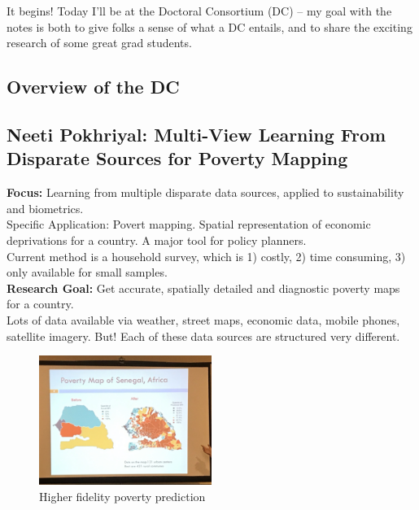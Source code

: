 It begins! Today I'll be at the Doctoral Consortium (DC) -- my goal with the notes is both to give folks a sense of what a DC entails, and to share the exciting research of some great grad students. \\

\subsection{Overview of the DC}




\subsection{Neeti Pokhriyal: Multi-View Learning From Disparate Sources for Poverty Mapping}

{\bf Focus:} Learning from multiple disparate data sources, applied to sustainability and biometrics. \\

Specific Application: Povert mapping. Spatial representation of economic deprivations for a country. A major tool for policy planners. \\

Current method is a household survey, which is 1) costly, 2) time consuming, 3) only available for small samples. \\

{\bf Research Goal:} Get accurate, spatially detailed and diagnostic poverty maps for a country. \\

Lots of data available via weather, street maps, economic data, mobile phones, satellite imagery. But! Each of these data sources are structured very different. \\

\begin{figure}[h!]
    \centering
    \includegraphics[width=0.5\textwidth]{images/pov_map.JPG}
    \caption{Higher fidelity poverty prediction}
    \label{fig:pov_map}
\end{figure}

